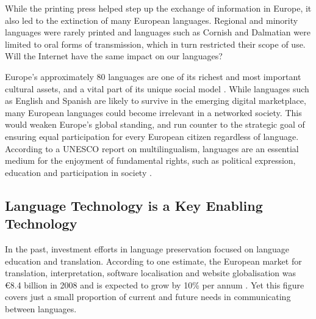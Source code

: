 \begin{multicols}{2}
\begin{itemize}
\begin{multicols}{2}
    While the printing press helped step up the exchange of information in Europe, it also led to the extinction of many European languages. Regional and minority languages were rarely printed and languages such as Cornish and Dalmatian were limited to oral forms of transmission, which in turn restricted their scope of use. Will the Internet have the same impact on our languages?


    Europe’s approximately 80 languages are one of its richest and most important cultural assets, and a vital part of its unique social model \cite{CAT-Nota2}. While languages such as English and Spanish are likely to survive in the emerging digital marketplace, many European languages could become irrelevant in a networked society. This would weaken Europe’s global standing, and run counter to the strategic goal of ensuring equal participation for every European citizen regardless of language. According to a UNESCO report on multilingualism, languages are an essential medium for the enjoyment of fundamental rights, such as political expression, education and participation in society \cite{CAT-Nota3}.

\subsection{Language Technology is a Key Enabling Technology}

    In the past, investment efforts in language preservation focused on language education and translation. According to one estimate, the European market for translation, interpretation, software localisation and website globalisation was €8.4 billion in 2008 and is expected to grow by 10\% per annum \cite{CAT-Nota3}. Yet this figure covers just a small proportion of current and future needs in communicating between languages. 


\end{multicols}
\end{itemize}
\end{multicols}
